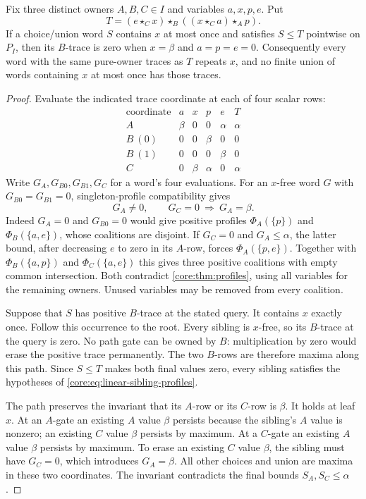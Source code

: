 \begin{proposition}
\label{core:prop:pure-source-repetition}
Fix three distinct owners $A,B,C\in I$ and variables $a,x,p,e$. Put
\[
 T=(e\star_C x)\star_B((x\star_C a)\star_A p).
\]
If a choice/union word $S$ contains $x$ at most once and satisfies
$S\leq T$ pointwise on $P_I$, then its $B$-trace is zero when
$x=\beta$ and $a=p=e=0$. Consequently every word with the same
pure-owner traces as $T$ repeats $x$, and no finite union of words
containing $x$ at most once has those traces.
\end{proposition}
\begin{proof}
Evaluate the indicated trace coordinate at each of four scalar rows:
\[
\begin{array}{c|cccc|c}
 \text{coordinate}&a&x&p&e&T\\\hline
 A&\beta&0&0&\alpha&\alpha\\
 B\ (0)&0&0&\beta&0&0\\
 B\ (1)&0&0&0&\beta&0\\
 C&0&\beta&\alpha&0&\alpha
\end{array}
\]
Write $G_A,G_{B0},G_{B1},G_C$ for a word's four evaluations.
For an $x$-free word $G$ with $G_{B0}=G_{B1}=0$, singleton-profile
compatibility gives
\begin{equation}\label{core:eq:linear-sibling-profiles}
 G_A\ne0,\qquad G_C=0\ \Longrightarrow\ G_A=\beta.
\end{equation}
Indeed $G_A=0$ and $G_{B0}=0$ would give positive profiles
$\Phi_A(\{p\})$ and $\Phi_B(\{a,e\})$, whose coalitions are disjoint.
If $G_C=0$ and $G_A\leq\alpha$, the latter bound, after decreasing
$e$ to zero in its $A$-row, forces $\Phi_A(\{p,e\})$.
Together with $\Phi_B(\{a,p\})$ and $\Phi_C(\{a,e\})$ this gives
three positive coalitions with empty common intersection. Both
contradict \cref{core:thm:profiles}, using all variables for the
remaining owners. Unused variables may be removed from every coalition.

Suppose that $S$ has positive $B$-trace at the stated query.
It contains $x$ exactly once. Follow this occurrence to the root.
Every sibling is $x$-free, so its $B$-trace at the query is zero.
No path gate can be owned by $B$: multiplication by zero would erase
the positive trace permanently. The two $B$-rows are therefore maxima
along this path. Since $S\leq T$ makes both final values zero, every
sibling satisfies the hypotheses of \eqref{core:eq:linear-sibling-profiles}.

The path preserves the invariant that its $A$-row or its $C$-row is
$\beta$. It holds at leaf $x$. At an $A$-gate an existing $A$ value
$\beta$ persists because the sibling's $A$ value is nonzero;
an existing $C$ value $\beta$ persists by maximum. At a $C$-gate
an existing $A$ value $\beta$ persists by maximum. To erase an
existing $C$ value $\beta$, the sibling must have $G_C=0$, which
introduces $G_A=\beta$. All other choices and union are maxima in
these two coordinates. The invariant contradicts the final bounds
$S_A,S_C\leq\alpha$.


\end{proof}
